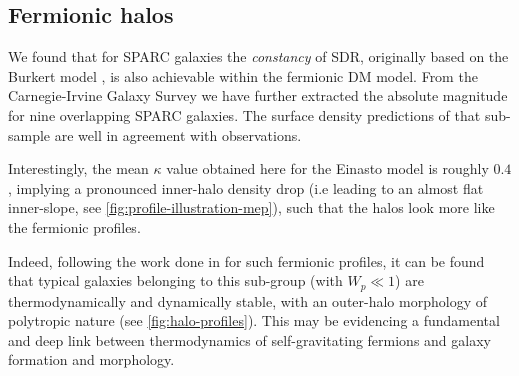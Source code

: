 \subsection{Fermionic halos}
We found that for SPARC galaxies the \textit{constancy} of SDR, originally based on the Burkert model \citep{2009MNRAS.397.1169D}, is also achievable within the fermionic DM model. From the Carnegie-Irvine Galaxy Survey \citep{2011ApJS..197...21H} we have further extracted the absolute magnitude for nine overlapping SPARC galaxies. The surface density predictions of that sub-sample are well in agreement with observations.


Interestingly, the mean $\kappa$ value obtained here for the Einasto model is roughly $0.4$, implying a pronounced inner-halo density drop (i.e leading to an almost flat inner-slope, see \cref{fig:profile-illustration-mep}), such that the halos look more like the fermionic profiles.

Indeed, following the work done in \cite{2021MNRAS.502.4227A} for such fermionic profiles, it can be found that typical galaxies belonging to this sub-group (with $W_p \ll 1$) are thermodynamically and dynamically stable, with an outer-halo morphology of polytropic nature (see \cref{fig:halo-profiles}). This may be evidencing a fundamental and deep link between thermodynamics of self-gravitating fermions and galaxy formation and morphology.

